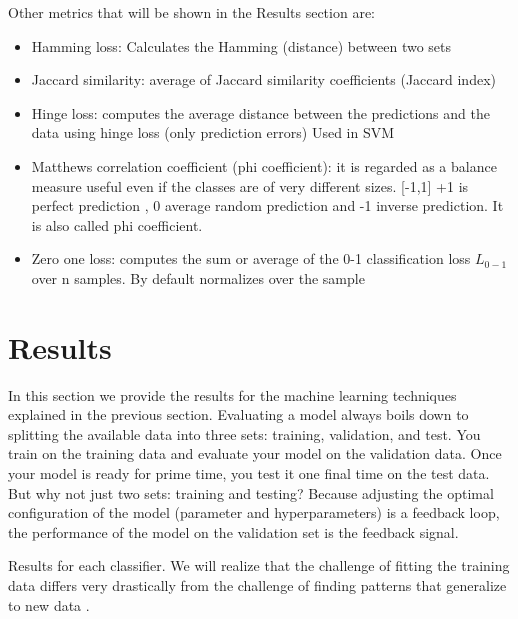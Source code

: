 \documentclass[11pt]{article}
\begin{document}
Other metrics that will be shown in the Results section are:
\begin{itemize}
	\item Hamming loss: Calculates the Hamming (distance) between two sets
	\item Jaccard similarity: average of Jaccard similarity coefficients (Jaccard index)
	\item Hinge loss: computes the average distance between the predictions and the data using hinge loss (only prediction errors) Used in SVM
	\item Matthews correlation coefficient (phi coefficient): it is regarded as a balance measure useful even if the classes are of very different sizes. [-1,1] +1 is perfect prediction , 0 average random prediction and -1 inverse prediction. It is also called phi coefficient.
	\item Zero one loss: computes the sum or average of the 0-1 classification loss $L_{0-1}$ over n samples. By default normalizes over the sample
\end{itemize}

\section{Results}
\label{se:res}

In this section we provide the results for the machine learning techniques explained in the previous section.
Evaluating a model always boils down to splitting the available data into three sets: training, validation, and test. You train on the training data and evaluate your model on the validation data. Once your model is ready for prime time, you test it one final time on the test data. 
But why not just two sets: training and testing? Because adjusting the optimal configuration of the model (parameter and hyperparameters) is a feedback loop, the performance of the model on the validation set is the feedback signal.

Results for each classifier. We will realize that the challenge of fitting the training data differs very drastically from the challenge of finding patterns that generalize to new data \cite{goodfellow2016deep}.
\end{document}
